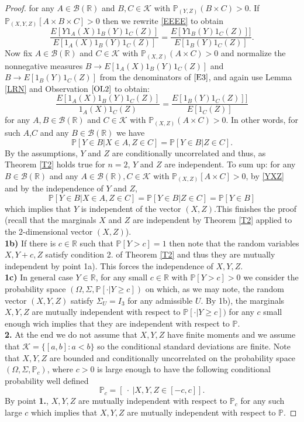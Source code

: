 \documentclass[sn-mathphys,Numbered,11pt]{sn-jnl}%
\theoremstyle{thmstyleone}%
\newcommand{\R}{\mathbb{R}}
\newcommand{\PP}{\mathbb{P}}
\newcommand{\B}{\mathcal{B}(\R)}
\newcommand{\KK}{\mathcal{K}}
\begin{document}
\begin{proof}
for any $A\in\B$ and $B,C\in\KK$ with $\PP_{(Y,Z)}(B\times C)>0$. If $\PP_{(X,Y,Z)}[A\times B\times C]>0$ then we rewrite \eqref{EEEE} to obtain
\begin{equation}\label{E3}\frac{E[Y1_A(X)1_B(Y)1_C(Z)]}{E[1_A(X)1_B(Y)1_C(Z)]}=\frac{E[Y1_B(Y)1_C(Z)]]}{E[1_B(Y)1_C(Z)]}.\end{equation}
Now fix $A\in\B$ and $C\in\KK$ with $\PP_{(X,Z)}(A\times C)>0$ and normalize the nonnegative measures $B\to E[1_A(X)1_B(Y)1_C(Z)]$ and $B\to E[1_B(Y)1_C(Z)]$ from the denominators of $\eqref{E3}$, and again use Lemma \ref{LRN} and Observation $\ref{OL2}$ to obtain:
$$\frac{E[1_A(X)1_B(Y)1_C(Z)]}{1_A(X)1_C(Z)}=\frac{E[1_B(Y)1_C(Z)]]}{E[1_C(Z)]}$$
for any $A,B\in\B $ and $C\in \KK$ with $\PP_{(X,Z)}(A\times C)>0$. In other words, for such $A$,$C$ and any $B\in\B$ we have
\begin{equation}\label{YXZ}\PP[Y\in B|X\in A, Z\in C]=\PP[Y\in B|Z\in C].
\end{equation} 
By the assumptions,  $Y$ and $Z$ are conditionally uncorrelated and thus, as Theorem \ref{T2} holds true for $n=2$, $Y$ and $Z$ are independent. To sum up:  for any $B\in\B$ and any $A\in \B,C\in\KK$ with $\PP_{(X,Z)}[A\times 
C]>0$, by \eqref{YXZ} and by the independence of $Y$ and $Z$,
$$\PP[Y\in B|X\in A, Z\in C]=\PP[Y\in B|Z\in C]=\PP[Y\in B]$$
which implies that $Y$ is independent of the vector $(X,Z)$.This finishes the proof (recall that the marginals $X$ and $Z$ are independent by Theorem \ref{T2} applied to the $2$-dimensional vector $(X,Z)$). \\
\textbf{1b)} If there is $c\in\R$ such that $\PP[Y>c]=1$ then note that the random variables $X,Y+c,Z$ satisfy condition 2. of Theorem \ref{T2} and thus they are mutually independent by point 1a). This forces the independence of $X,Y,Z$. \\
\textbf{1c)} In general case $Y\in\R$, for any small $c\in\R$ with $\PP[Y>c]>0$ we consider the probability space $(\Omega,\Sigma,\PP[\cdot|Y\geq c])$ on which, as we may note, the random vector $(X,Y,Z)$ satisfy $\Sigma_U=I_3$ for any admissible $U$. By 1b), the marginals $X,Y,Z$ are mutually independent with respect to $\PP[\cdot|Y\geq c])$ for any $c$ small enough wich implies that they are independent with respect to $\PP$.\\

\textbf{2.} At the end we do not assume that $X,Y,Z$ have finite moments and we assume that $\KK=\{[a,b]\colon a<b\}$ so  the conditional standard deviations are finite. Note that  $X,Y,Z$ are bounded and conditionally uncorrelated on the probability space $(\Omega,\Sigma,\PP_c)$, where $c>0$ is large enough to have the following  conditional probability well defined 
$$\PP_c=[\ \cdot \ | X,Y,Z\in [-c,c]].$$
By point \textbf{1.}, $X,Y,Z$ are mutually independent with respect to $\PP_c$ for any such large $c$ which implies that $X,Y,Z$ are mutually independent with respect to $\PP$.
\end{proof}
\end{document}
